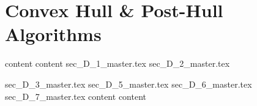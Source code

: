 \clearpage
\chapter{Convex Hull \& Post-Hull Algorithms}
{content}
{content}
{sec_D_1_master.tex}
{sec_D_2_master.tex}


{sec_D_3_master.tex}
{sec_D_5_master.tex}
{sec_D_6_master.tex}
{sec_D_7_master.tex} 
{content} 
{content}